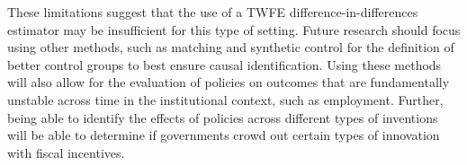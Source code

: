 \documentclass[../main.tex]{subfiles}
\begin{document}
These limitations suggest that the use of a TWFE difference-in-differences estimator may be insufficient for this type of setting. Future research should focus using other methods, such as matching \parencite{caliendo_kopeinig08a} and synthetic control \parencite{abadie_etal10} for the definition of better control groups to best ensure causal identification. Using these methods will also allow for the evaluation of policies on outcomes that are fundamentally unstable across time in the institutional context, such as employment. Further, being able to identify the effects of policies across different types of inventions will be able to determine if governments crowd out certain types of innovation with fiscal incentives. 
\end{document}
